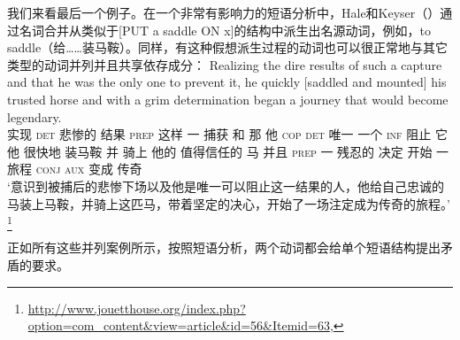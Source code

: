     我们来看最后一个例子。在一个非常有影响力的短语分析中，Hale和Keyser（\citeyear{HK93a-u}）通过名词合并从类似于[PUT a saddle ON x]的结构中派生出名源动词，例如，to saddle（给……装马鞍）。同样，有这种假想派生过程的动词也可以很正常地与其它类型的动词并列并且共享依存成分：
\ea
\gll Realizing the dire results of such a capture and that he was the only one to prevent it, he quickly [saddled and mounted] his trusted horse and with a grim determination began a journey that would become legendary.\\
    实现 \textsc{det} 悲惨的 结果 \textsc{prep} 这样 一 捕获 和 那 他 \textsc{cop} \textsc{det} 唯一 一个 \textsc{inf} 阻止 它 他 很快地 \spacebr{}装马鞍 并 骑上 他的 值得信任的 马 并且 \textsc{prep} 一 残忍的 决定 开始 一 旅程 \textsc{conj} \textsc{aux} 变成 传奇\\
\glt `意识到被捕后的悲惨下场以及他是唯一可以阻止这一结果的人，他给自己忠诚的马装上马鞍，并骑上这匹马，带着坚定的决心，开始了一场注定成为传奇的旅程。' 
\footnote{\url{http://www.jouetthouse.org/index.php?option=com_content&view=article&id=56&Itemid=63},
  }  
\z

\noindent
正如所有这些\xnullc 并列案例所示，按照短语分析，两个动词都会给单个短语结构提出矛盾的要求。



